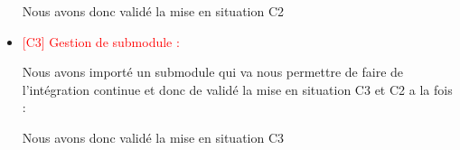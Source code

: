 \begin{itemize}
    Nous avons donc validé la mise en situation C2
    
    \item \textcolor{red}{[C3] Gestion de submodule : }

    Nous avons importé un submodule qui va nous permettre de faire de l'intégration continue et donc de validé la mise en situation C3 et C2 a la fois :
    \\



    Nous avons donc validé la mise en situation C3
    
\end{itemize}
